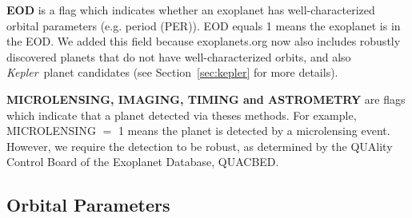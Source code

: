 \documentclass[11pt,preprint]{aastex}
\def\kepler{\textit{Kepler}}
\begin{document}
\begin{CJK*}{UTF8}{gbsn}
\begin{comment}
\textit {Sharon: you need to say what KOI stores. When writing each
  field, keep in mind you need to cover the following so that the
  reader will completely understand: (1) what the field stands for
  (e.g., in case of an abbreviation like KOI); (2) what the field
  physically means, like `KOI' means planet candidates that have
  transit signals as detected by \kepler\ but have not been confirmed,
  and make sure to be thorough at what you say -- sometimes things are
  not that obvious to an outsider reader, e.g., think if a cosmologist
  would understand what you're saying when reading it; (3) what the
  field actually contains, e.g. KOI contains the KOI number designated
  by the \kepler\ team (right?), it is a floating point number, and
  sometimes maybe even worth giving an example, e.g. KOI 30.1 or
  something...; (4) why we added this new field, if this information
  is helpful, or if it's a revised field since \cite{Wright2011}, what
  is changed. Also, use \kepler\ (which is a defined symbol in our
  ms.tex file), instead of typing out Kepler, since you need italic.
  Don't be afraid to write more! Being concise is important, but it's
  always easier to trim down things than to add things on, especially
  for a documentation type of paper like this. Let's be thorough at
  first, then try to reach optimal conciseness.}
 \end{comment}


{\bf EOD} is a flag which indicates whether an exoplanet has
well-characterized orbital parameters (e.g. period (PER)). EOD equals
1 means the exoplanet is in the EOD. We added this field because
exoplanets.org now also includes robustly discovered planets that do
not have well-characterized orbits, and also \kepler\ planet
candidates (see Section~\ref{sec:kepler} for more details).

{\bf MICROLENSING, IMAGING, TIMING and ASTROMETRY} are flags which
indicate that a planet detected via theses methods. For example,
MICROLENSING $=$ 1 means the planet is detected by a microlensing
event. However, we require the detection to be robust, as determined
by the QUAlity Control Board of the Exoplanet Database, QUACBED.


\subsection{Orbital Parameters}\label{sec:orbit}


\end{CJK*}
\end{document}
